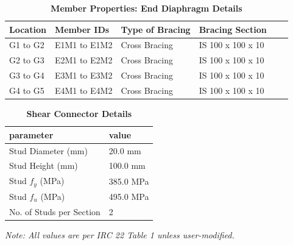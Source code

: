 \documentclass[12pt,a4paper]{report}
\numberwithin{table}{chapter}
\numberwithin{figure}{chapter}
\begin{document}
\vspace{0.4em}
\noindent
\setlength{\tabcolsep}{4pt}
\setlength\LTleft{0pt}
\setlength\LTright{\fill}

\begin{longtable}{|L{2.2cm}|L{2.2cm}|L{3.0cm}|L{2.5cm}|C{1.8cm}|C{1.8cm}|}
\caption{\textbf{Member Properties: End Diaphragm Details}}
\hline
\textbf{Location} & \textbf{Member IDs} & \textbf{Type of Bracing} & \textbf{Bracing Section} \\
\hline
G1 to G2 & E1M1 to E1M2 & Cross Bracing & IS 100 x 100 x 10 \\[6pt]
\hline
G2 to G3 & E2M1 to E2M2 & Cross Bracing & IS 100 x 100 x 10 \\[6pt]
\hline
G3 to G4 & E3M1 to E3M2 & Cross Bracing & IS 100 x 100 x 10 \\[6pt]
\hline
G4 to G5 & E4M1 to E4M2 & Cross Bracing & IS 100 x 100 x 10 \\[6pt]
\hline
\end{longtable}



\label{subsec:shear-connectors}

\vspace{2.2em}

\vspace{0.4em}
\begin{longtable}{|L{5.5cm}|p{10.0cm}|}
\caption{\textbf{Shear Connector Details}}
\hline
\textbf{parameter} & \textbf{value} \\
\hline
\textnormal{Stud Diameter (mm)} & 20.0 mm \\[6pt]
\hline
\textnormal{Stud Height (mm)} & 100.0 mm \\[6pt]
\hline
\textnormal{Stud $f_y$ (MPa)} & 385.0 MPa \\[6pt]
\hline
\textnormal{Stud $f_u$ (MPa)} & 495.0 MPa \\[6pt]
\hline
\textnormal{No. of Studs per Section} & 2 \\[6pt]
\hline
\end{longtable}



\label{subsec:safety-factors}

\vspace{2.2em}

\vspace{0.3em}
\noindent\textit{Note: All values are per IRC 22 Table 1 unless user-modified.}
\end{document}
